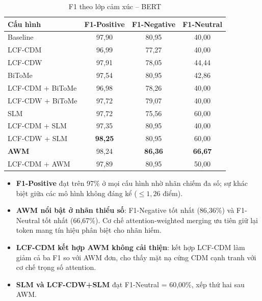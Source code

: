 \begin{table}[H]
\centering
\small
\caption{F1 theo lớp cảm xúc -- BERT}
\label{tab:sent_perclass_avg}
\begin{threeparttable}
\begin{tabular}{@{}lccc@{}}
\toprule
\textbf{Cấu hình} & \textbf{F1-Positive} & \textbf{F1-Negative} & \textbf{F1-Neutral} \\
\midrule
Baseline                  & 97,90 & 80,95 & 40,00 \\
\midrule
LCF-CDM                   & 96,99 & 77,27 & 40,00 \\
LCF-CDW                   & 97,91 & 78,05 & 44,44 \\
\midrule
BiToMe                    & 97,54 & 80,95 & 42,86 \\
LCF-CDM + BiToMe          & 96,98 & 78,26 & 40,00 \\
LCF-CDW + BiToMe          & 97,72 & 79,07 & 40,00 \\
\midrule
SLM                       & 97,72 & 75,56 & 60,00 \\
LCF-CDM + SLM             & 97,35 & 80,95 & 40,00 \\
LCF-CDW + SLM             & \textbf{98,25} & 80,95 & 60,00 \\
\midrule
\textbf{AWM}              & 98,24 & \textbf{86,36} & \textbf{66,67} \\
LCF-CDM + AWM             & 97,89 & 80,95 & 50,00 \\
\bottomrule
\end{tabular}
\end{threeparttable}
\end{table}

\begin{itemize}
  \item \textbf{F1-Positive} đạt trên 97\% ở mọi cấu hình nhờ nhãn
        chiếm đa số; sự khác biệt giữa các mô hình không đáng kể
        ($\leq 1,26$ điểm).
  \item \textbf{AWM nổi bật ở nhãn thiểu số}: F1-Negative tốt nhất
        (86,36\%) và F1-Neutral tốt nhất (66,67\%). Cơ chế
        attention-weighted merging ưu tiên giữ lại token mang tín hiệu
        phân biệt cho nhãn hiếm.
  \item \textbf{LCF-CDM kết hợp AWM không cải thiện}: kết hợp LCF-CDM
        làm giảm cả ba F1 so với AWM đơn, cho thấy mặt nạ cứng CDM
        cạnh tranh với cơ chế trọng số attention.
  \item \textbf{SLM và LCF-CDW+SLM} đạt F1-Neutral = 60,00\%,
        xếp thứ hai sau AWM.
\end{itemize}

